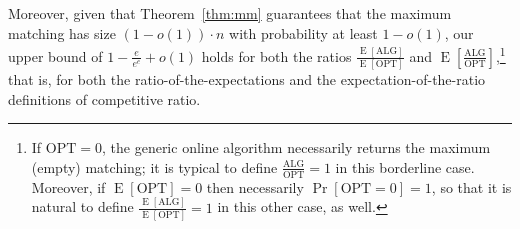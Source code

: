 \documentclass[11pt]{article}
\DeclareMathOperator*{\E}{E}
\begin{document}
\smallskip

Moreover, given that Theorem~\ref{thm:mm} guarantees that the maximum matching has size $(1-o(1)) \cdot n$ with probability at least $1-o(1)$, our upper bound of $1-\frac{e}{e^e} + o(1)$ holds for both the ratios $\frac{\E[\text{ALG}]}{\E[\text{OPT}]}$ and $\E\left[\frac{\text{ALG}}{\text{OPT}}\right]$,\footnote{If $\text{OPT} = 0$, the generic online algorithm  necessarily returns the maximum (empty) matching;  it is typical to define $\frac{\text{ALG}}{\text{OPT}} = 1$ in this borderline case. Moreover, if $\E[\text{OPT}] = 0$ then necessarily $\Pr[\text{OPT} = 0] = 1$,  so that it is natural to define $\frac{\E[\text{ALG}]}{\E[\text{OPT}]} = 1$ in this other case, as well.}  that is, for both the ratio-of-the-expectations and the expectation-of-the-ratio definitions of competitive ratio.
\end{document}
